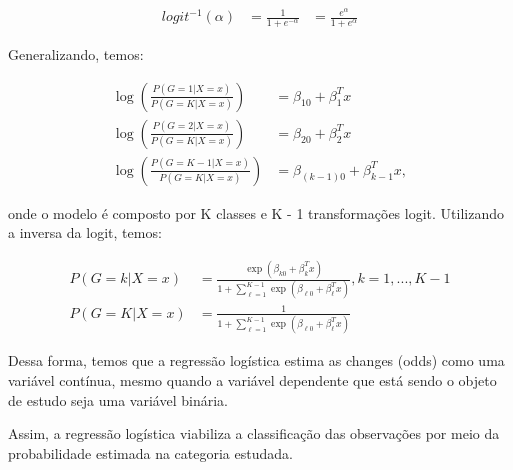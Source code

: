 \begin{equation}
  \label{eq:t}
  \begin{aligned}
    logit^{-1}(\alpha) &= \frac{1}{1+e^{-\alpha}} &= \frac{e^{\alpha}}{1+e^{\alpha}}
  \end{aligned}
\end{equation}

Generalizando, temos:

\begin{equation}
  \label{eq:t}
  \begin{aligned}
    \log\left ( \frac{P(G = 1 | X = x)}{P(G = K | X = x)} \right ) &= \beta_{10}+\beta_{1}^{T}x\\
    \log\left ( \frac{P(G = 2 | X = x)}{P(G = K | X = x)} \right ) &= \beta_{20}+\beta_{2}^{T}x\\
    \log\left ( \frac{P(G = K-1 | X = x)}{P(G = K | X = x)} \right ) &= \beta_{(k-1)0}+\beta_{k-1}^{T}x,
  \end{aligned}
\end{equation}

onde o modelo é composto por K classes e K - 1 transformações logit. Utilizando a inversa da logit, temos:

\begin{equation}
  \label{eq:t}
  \begin{aligned}
    P(G = k | X = x) &= \frac{\exp \left ( \beta_{k0}+\beta_{k}^{T}x \right )}{1 + \sum_{\ell=1}^{K - 1}\exp \left ( \beta_{\ell0}+\beta_{\ell}^{T}x \right )}, k = 1, ..., K - 1\\
    P(G = K | X = x) &= \frac{1}{1 + \sum_{\ell=1}^{K - 1}\exp \left ( \beta_{\ell0}+\beta_{\ell}^{T}x \right )}
  \end{aligned}
\end{equation}

Dessa forma, temos que a regressão logística estima as changes (odds) como uma variável contínua, mesmo quando a variável dependente que está sendo o objeto de estudo seja uma variável binária. 

Assim, a regressão logística viabiliza a classificação das observações por meio da probabilidade estimada na categoria estudada.
